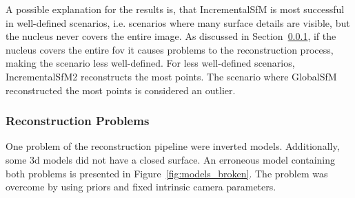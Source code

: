 A possible explanation for the results is, that IncrementalSfM is most successful in well-defined scenarios, i.e. scenarios where many surface details are visible, but the nucleus never covers the entire image. As discussed in Section~\ref{sec:recon_problems}, if the nucleus covers the entire \gls{fov} it causes problems to the reconstruction process, making the scenario less well-defined. For less well-defined scenarios, IncrementalSfM2 reconstructs the most points. The scenario where GlobalSfM reconstructed the most points is considered an outlier.

\subsubsection{Reconstruction Problems} \label{sec:recon_problems}
One problem of the reconstruction pipeline were inverted models. Additionally, some \gls{3d} models did not have a closed surface. An erroneous model containing both problems is presented in Figure~\ref{fig:models_broken}. The problem was overcome by using priors and fixed intrinsic camera parameters.
